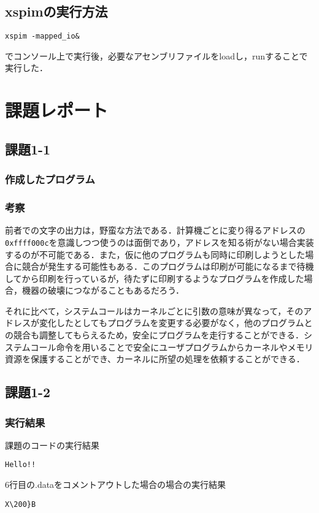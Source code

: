 \documentclass[a4j,11pt]{jarticle}
\begin{document}
\subsection{xspimの実行方法}
\begin{verbatim}
xspim -mapped_io&
\end{verbatim}
でコンソール上で実行後，必要なアセンブリファイルをloadし，runすることで実行した．
\section{課題レポート}

 \subsection{課題1-1}

  \subsubsection{作成したプログラム}

    
    

  \subsubsection{考察}
  
  前者での文字の出力は，野蛮な方法である．計算機ごとに変り得るアドレスの\verb|0xffff000c|を意識しつつ使うのは面倒であり，アドレスを知る術がない場合実装するのが不可能である．また，仮に他のプログラムも同時に印刷しようとした場合に競合が発生する可能性もある．このプログラムは印刷が可能になるまで待機してから印刷を行っているが，待たずに印刷するようなプログラムを作成した場合，機器の破壊につながることもあるだろう．

それに比べて，システムコールはカーネルごとに引数の意味が異なって，そのアドレスが変化したとしてもプログラムを変更する必要がなく，他のプログラムとの競合も調整してもらえるため，安全にプログラムを走行することができる．システムコール命令を用いることで安全にユーザプログラムからカーネルやメモリ資源を保護することができ、カーネルに所望の処理を依頼することができる．

 \subsection{課題1-2}
\subsubsection{実行結果}
  \begin{screen}
    課題のコードの実行結果
    \end{screen}
    \begin{verbatim}
Hello!!
    \end{verbatim}
  \begin{screen}
    6行目の.dataをコメントアウトした場合の場合の実行結果
    \end{screen}
    \begin{verbatim}
X\200}B
    \end{verbatim}
\end{document}
